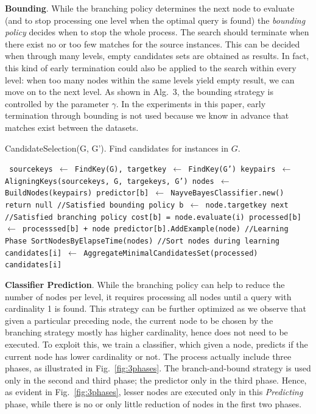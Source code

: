 \textbf{Bounding}. While the branching policy determines the next node to evaluate (and to stop processing one level when the optimal query is found)  the \emph{bounding policy} decides when to stop the whole process. The search should terminate when there exist no or too few matches for the source instances. This can be decided when through many levels, empty candidates sets are obtained as results. In fact, this kind of early termination could also be applied to the search within every level: when too many nodes within the same levels yield empty result, we can move on to the next level. As shown in Alg.~3, the bounding strategy is 
controlled by the parameter $\gamma$. In the experiments in this paper, early termination through bounding is not used because we know in advance that matches exist between the datasets. 
\begin{algorithm}
\caption{CandidateSelection(G, G'). Find candidates for instances in $G$.}
\begin{algorithmic}
\scriptsize\tt
\STATE  sourcekeys  $\leftarrow$ FindKey(G),  targetkey  $\leftarrow$ FindKey(G')
\STATE  keypairs  $\leftarrow$ AligningKeys(sourcekeys, G, targekeys, G') 
\STATE  nodes  $\leftarrow$ BuildNodes(keypairs) 
\STATE predictor[b] $\leftarrow$ NayveBayesClassifier.new()
\ENDFOR 
{} %
\STATE  return null //Satisfied bounding policy
\ENDIF
{}  
\STATE  b $\leftarrow$ node.targetkey
\STATE next //Satisfied branching policy 
\ENDIF
{}  
\STATE  cost[b] = node.evaluate(i) 
\STATE  processed[b] $\leftarrow$  processsed[b] + node 
\ENDIF 
{} 
\STATE    predictor[b].AddExample(node) //Learning Phase
\ENDIF
\ENDFOR
{} 
\STATE    SortNodesByElapseTime(nodes)  //Sort nodes during learning
\ENDIF
\STATE  candidates[i] $\leftarrow$ AggregateMinimalCandidatesSet(processed)
\ENDFOR 
\RETURN candidates[i]
\end{algorithmic}
\end{algorithm}

\textbf{Classifier Prediction}. 
While the branching policy can help to reduce the number of nodes per level, it requires processing all nodes until a query with cardinality 1 is found. This strategy can be further optimized as we observe that given a particular preceding node, the current node to be chosen by the branching strategy 
mostly has higher cardinality, hence does not need to be executed. To exploit this, we train a classifier, which given a node, predicts if the current node has lower cardinality or not. The process actually include three phases, as illustrated in Fig.~\ref{fig:3phases}. The branch-and-bound strategy is used only in the second and third phase; the predictor only in the third phase. Hence, as evident in Fig.~\ref{fig:3phases}, lesser nodes are executed only in this \emph{Predicting} phase, while there is no or only little reduction of nodes in the first two phases. 

